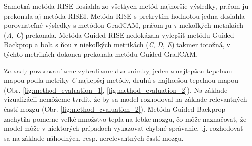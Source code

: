 Samotná metóda RISE dosiahla zo všetkych metód najhoršie výsledky, pričom ju prekonala aj metóda RISEI. Metóda RISE s prekrytím hodnotou jedna dosiahla porovnateľné výsledky s metódou GradCAM, pričom ju v niekoľkých metrikách (\textit{A}, \textit{C}) prekonala. Metóda Guided RISE nedokázala vylepšiť metódu Guided Backprop a bola s ňou v niekoľkých metrikách (\textit{C}, \textit{D}, \textit{E}) takmer totožná, v týchto metrikách dokonca prekonala metódu Guided GradCAM.

Zo sady pozorovaní sme vybrali sme dva snímky, jeden s najlepšou tepelnou mapou podľa metriky \textit{C} najlepšej metódy, druhú s najhoršou tepelnou mapou (Obr. \ref{fig:method_evaluation_1}, \ref{fig:method_evaluation_2}). Na základe vizualizácii nemôžeme tvrdiť, že by sa model rozhodoval na základe relevantných častí mozgu (Obr. \ref{fig:method_evaluation_2}). Metóda Guided Backprop zachytila pomerne veľké množstvo tepla na lebke mozgu, čo môže naznačovať, že model môže v niektorých prípadoch vykazovať chybné správanie, tj. rozhodovať sa na základe náhodných, resp. nerelevantných častí mozgu.

